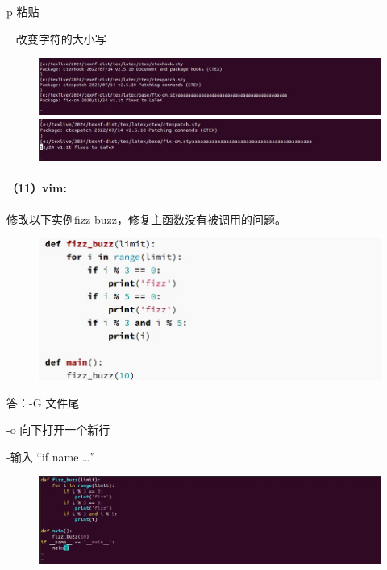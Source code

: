 \documentclass[a4paper, 12pt]{article}
\begin{document}
	p 粘贴
	
	~ 改变字符的大小写
	
	\begin{figure}[H]
		\centering
		\includegraphics[width=1\textwidth]{031.jpg}
		\includegraphics[width=1\textwidth]{032.jpg}
	\end{figure}
	
	\paragraph{（11）vim:}	
	修改以下实例fizz buzz，修复主函数没有被调用的问题。
	
	\begin{figure}[H]
	\centering
	\includegraphics[width=1\textwidth]{033.jpg}
	\end{figure}

	答：-G 文件尾
	
	-o 向下打开一个新行
	
	-输入 “if name …”
	
	\begin{figure}[H]
		\centering
		\includegraphics[width=1\textwidth]{034.jpg}
	\end{figure}
	
\end{document}
